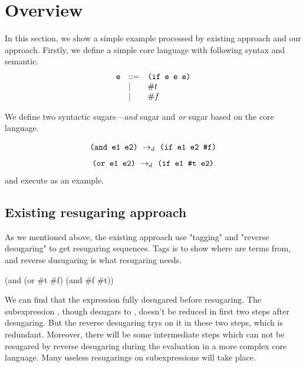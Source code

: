 \section{Overview}
\label{sec2}

In this section, we show a simple example processed by existing approach and our approach. Firstly, we define a simple core language with following syntax and semantic.
\[
\begin{array}{lll}
\mbox{\tt e} &::=& \texttt{(if~e~e~e)}\\
& |& \#t\\
& |& \#f
\end{array}
\]

{\rightarrow{}}

We define two syntactic sugars---\emph{and} sugar and \emph{or} sugar based on the core language.

\[
\texttt{(and e1 e2)} ~\rightarrow_d~ \texttt{(if e1 e2 \#f)}
\]
\[
\texttt{(or e1 e2)} ~\rightarrow_d~ \texttt{(if e1 \#t e2)}
\]
and execute  as an example.

\subsection{Existing resugaring approach}
As we mentioned above, the existing approach use "tagging" and "reverse desugaring" to get resugaring sequences. Tags is to show where are terms from, and reverse dusugaring is what resugaring needs.

\begin{Codes}
    (and (or \#t \#f) (and \#f \#t))
  
 
 
 
\end{Codes}

We can find that the expression fully desugared before resugaring. The subexpression , though desugars to , doesn't be reduced in first two steps after desugaring. But the reverse desugaring trys on it in these two steps, which is redundant. Moreover, there will be some intermediate steps which can not be resugared by reverse desugaring during the evaluation in a more complex core language. Many useless resugarings on subexpressions will take place.

